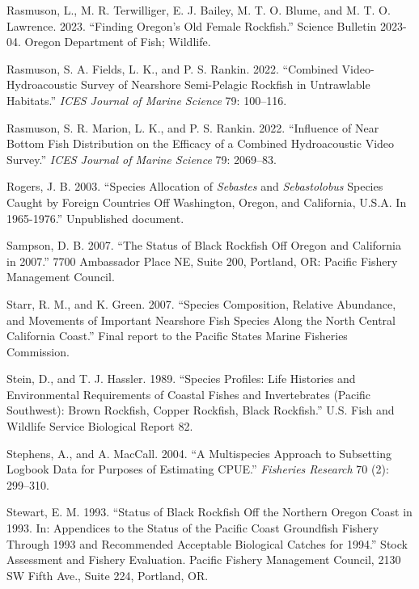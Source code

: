 \documentclass[11pt,
  english,
  letterpaper,
]{article}
\newlength{\cslhangindent}
\newenvironment{CSLReferences}[2] %
 {%
  \setlength{\parindent}{0pt}
  \ifodd #1 \everypar{\setlength{\hangindent}{\cslhangindent}}\ignorespaces\fi
  \ifnum #2 > 0
  \setlength{\parskip}{#2\baselineskip}
  \fi
 }%
 {}
\begin{document}
\begin{CSLReferences}{1}{0}
\leavevmode{}%
Rasmuson, L., M. R. Terwilliger, E. J. Bailey, M. T. O. Blume, and M. T. O. Lawrence. 2023. {``Finding Oregon's Old Female Rockfish.''} Science Bulletin 2023-04. Oregon Department of Fish; Wildlife.

\leavevmode{}%
Rasmuson, S. A. Fields, L. K., and P. S. Rankin. 2022. {``Combined Video-Hydroacoustic Survey of Nearshore Semi-Pelagic Rockfish in Untrawlable Habitats.''} \emph{{ICES} Journal of Marine Science} 79: 100--116.

\leavevmode{}%
Rasmuson, S. R. Marion, L. K., and P. S. Rankin. 2022. {``Influence of Near Bottom Fish Distribution on the Efficacy of a Combined Hydroacoustic Video Survey.''} \emph{{ICES} Journal of Marine Science} 79: 2069--83.

\leavevmode{}%
Rogers, J. B. 2003. {``Species Allocation of \emph{{Sebastes}} and \emph{Sebastolobus} Species Caught by Foreign Countries Off {Washington}, {Oregon}, and {California}, {U}.{S}.{A}. In 1965-1976.''} Unpublished document.

\leavevmode{}%
Sampson, D. B. 2007. {``The Status of Black Rockfish Off Oregon and California in 2007.''} 7700 Ambassador Place NE, Suite 200, Portland, OR: Pacific Fishery Management Council.

\leavevmode{}%
Starr, R. M., and K. Green. 2007. {``Species Composition, Relative Abundance, and Movements of Important Nearshore Fish Species Along the North Central California Coast.''} Final report to the Pacific States Marine Fisheries Commission.

\leavevmode{}%
Stein, D., and T. J. Hassler. 1989. {``Species Profiles: Life Histories and Environmental Requirements of Coastal Fishes and Invertebrates (Pacific Southwest): Brown Rockfish, Copper Rockfish, Black Rockfish.''} U.S. Fish and Wildlife Service Biological Report 82.

\leavevmode{}%
Stephens, A., and A. MacCall. 2004. {``A Multispecies Approach to Subsetting Logbook Data for Purposes of Estimating {CPUE}.''} \emph{Fisheries Research} 70 (2): 299--310.

\leavevmode{}%
Stewart, E. M. 1993. {``Status of Black Rockfish Off the Northern Oregon Coast in 1993. In: Appendices to the Status of the Pacific Coast Groundfish Fishery Through 1993 and Recommended Acceptable Biological Catches for 1994.''} Stock Assessment and Fishery Evaluation. Pacific Fishery Management Council, 2130 SW Fifth Ave., Suite 224, Portland, OR.


\end{CSLReferences}
\end{document}
